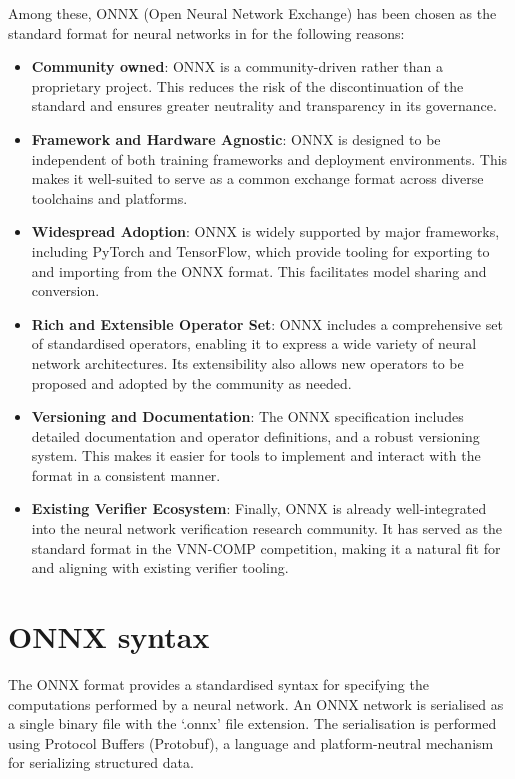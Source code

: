 Among these, ONNX (Open Neural Network Exchange) has been chosen as the standard format for neural networks in \vnnlib{} for the following reasons:
\begin{itemize}
\item \textbf{Community owned}: ONNX is a community-driven rather than a proprietary project. This reduces the risk of the discontinuation of the standard and ensures greater neutrality and transparency in its governance.
\item \textbf{Framework and Hardware Agnostic}: ONNX is designed to be independent of both training frameworks and deployment environments. This makes it well-suited to serve as a common exchange format across diverse toolchains and platforms.
\item \textbf{Widespread Adoption}: ONNX is widely supported by major frameworks, including PyTorch and TensorFlow, which provide tooling for exporting to and importing from the ONNX format. This facilitates model sharing and conversion.
\item \textbf{Rich and Extensible Operator Set}: ONNX includes a comprehensive set of standardised operators, enabling it to express a wide variety of neural network architectures. Its extensibility also allows new operators to be proposed and adopted by the community as needed.

\item \textbf{Versioning and Documentation}: The ONNX specification includes detailed documentation and operator definitions, and a robust versioning system. This makes it easier for tools to implement and interact with the format in a consistent manner.

\item \textbf{Existing Verifier Ecosystem}: Finally, ONNX is already well-integrated into the neural network verification research community. It has served as the standard format in the VNN-COMP competition, making it a natural fit for \vnnlib{} and aligning with existing verifier tooling.
\end{itemize}

\section{ONNX syntax}
\label{sec:onnx_overview}

The ONNX format provides a standardised syntax for specifying the computations performed by a neural network. An ONNX network is serialised as a single binary file with the `.onnx' file extension. The serialisation is performed using Protocol Buffers (Protobuf), a language and platform-neutral mechanism for serializing structured data. 

